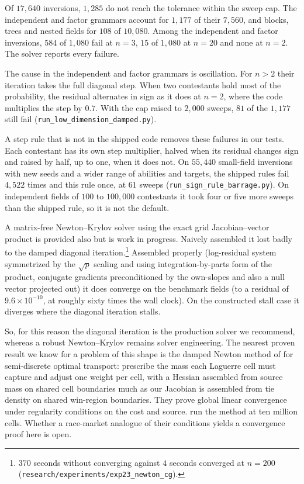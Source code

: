 \documentclass[11pt]{article}
\begin{document}
Of $17{,}640$ inversions, $1{,}285$ do not reach the tolerance within
the sweep cap. The independent and factor grammars account for $1{,}177$
of their $7{,}560$, and blocks, trees and nested fields for $108$ of
$10{,}080$. Among the independent and factor inversions, $584$ of
$1{,}080$ fail at $n=3$, $15$ of $1{,}080$ at $n=20$ and none at $n=2$.
The solver reports every failure.

The cause in the independent and factor grammars is oscillation. For
$n>2$ their iteration takes the full diagonal step. When two contestants
hold most of the probability, the residual alternates in sign as it does
at $n=2$, where the code multiplies the step by $0.7$. With the cap
raised to $2{,}000$ sweeps, $81$ of the $1{,}177$ still fail
(\texttt{run\_low\_dimension\_damped.py}).

A step rule that is not in the shipped code removes these failures in
our tests. Each contestant has its own step multiplier, halved when its
residual changes sign and raised by half, up to one, when it does not.
On $55{,}440$ small-field inversions with new seeds and a wider
range of abilities and targets, the shipped rules
fail $4{,}522$ times and this rule once, at $61$ sweeps
(\texttt{run\_sign\_rule\_barrage.py}). On independent fields of $100$
to $100{,}000$ contestants it took four or five more sweeps than the
shipped rule, so it is not the default.

A matrix-free Newton--Krylov solver using the exact grid Jacobian--vector product is
provided also but is work in progress. Naively assembled it lost badly to the damped diagonal iteration.\footnote{
$370$ seconds without converging against $4$ seconds converged at
$n=200$ (\texttt{research/experiments/exp23\_newton\_cg}).} Assembled properly (log-residual system symmetrized by the
$\sqrt{p}$ scaling and using integration-by-parts form of the product,
conjugate gradients preconditioned by the own-slopes and also a null vector
projected out) it
does converge on the benchmark fields (to a residual of
$9.6\times10^{-10}$, at roughly sixty times the wall clock). On the constructed stall case it
diverges where the diagonal iteration stalls.

So, for this reason the diagonal iteration
is the production solver we recommend, whereas a robust Newton--Krylov remains solver
engineering. The nearest
proven result we know for a problem of this shape is the damped Newton
method of \citet{kitagawa2019} for semi-discrete optimal transport:
prescribe the mass each Laguerre cell must capture and adjust one
weight per cell, with a Hessian assembled from source mass on shared
cell boundaries much as our Jacobian is assembled from tie density on
shared win-region boundaries. They prove global linear convergence
under regularity conditions on the cost and source.
\citet{levy2021} run the method at ten million cells. Whether a
race-market analogue of their conditions yields a convergence proof
here is open.
\end{document}
